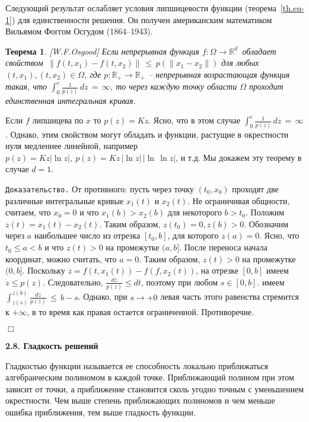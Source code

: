 \documentclass[12pt,a4paper]{article}
\newtheorem{theorem}{Теорема}
\newcommand{\re}{{\mathbb R}}
\begin{document}
Следующий результат ослабляет условия липшицевости функции (теорема~\ref{th.eu-1}) для единственности решения.
Он получен американским математиком Вильямом Фоггом Осгудом  (1864--1943).
\begin{theorem}\label{th.osgud}[W.F.Osgood]
Если непрерывная функция $f: \Omega \to \re^d\, $ обладает свойством
 $\, \|f(t, x_1) - f(t, x_2)\| \, \le \, p(\|x_1 - x_2\|)$
для любых $(t, x_1), (t, x_2) \in \Omega$, где $p: \re_+ \to \re_+$ --  непрерывная возрастающая функция
такая, что $\int_{0}^{c} \frac{1}{p(z)}\, d z \, = \, \infty$, то через каждую точку области $\Omega$ проходит единственная интегральная кривая.
\end{theorem}
Если $f$ липшицева по $x$ то $p(z) = Kz$. Ясно, что в этом случае $\int_{0}^{c} \frac{1}{p(z)}\, d z \, = \, \infty$.
Однако, этим свойством могут обладать и функции, растущие в окрестности нуля медленнее  линейной, например $p(z) = K z |\ln z|, \ p(z) = K z \, |\ln z|\, |\ln \, \ln z|$, и т.д. Мы докажем эту теорему в случае $d=1$.
\smallskip

{\tt Доказательство.} От противного: пусть  через точку $(t_0, x_0)$ проходят две различные интегральные кривые
$x_1(t)$ и $x_2(t)$. Не ограничивая общности, считаем, что $x_0 = 0$ и что $
x_1(b) > x_2 (b)$ для некоторого $b > t_0$. Положим $z (t) = x_1(t) - x_2(t)$. Таким образом,
 $z(t_0) = 0, z(b)  > 0$.
 Обозначим через $a$ наибольшее число из отрезка $[t_0, b]$, для которого $z(a) = 0$.
 Ясно, что $t_0\le a < b$ и что $z(t) > 0$ на промежутке $(a, b]$.
 После переноса начала координат, можно считать, что $a=0$. Таким образом, $z(t)>0$
 на промежутке $(0, b]$. Поскольку  $\dot z = f(t, x_1(t)) - f(f, x_2(t))$, на отрезке $[0, b]$
 имеем $\dot z \le p(z)$. Следовательно, $\frac{dz}{p(z)} \le dt$, поэтому при любом $s \in [0, b]$.
имеем  $\int_{z(s)}^{z(b)} \frac{d z}{p(z)}\, \le \, b - s $.
  Однако, при $s \to +0$ левая часть этого равенства стремится к $+\infty$, в то время как
  правая остается ограниченной. Противоречие.

   {\hfill $\Box$}
\medskip


\medskip
\begin{center}
\textbf{2.8. Гладкость решений}
\end{center}
\medskip

Гладкостью функции называется ее способность локально приближаться алгебраическим полиномом в каждой точке.
Приближающий полином при этом зависит от точки, а приближение становится сколь угодно точным с уменьшением окрестности.
 Чем выше степень приближающих полиномов и чем меньше ошибка приближения, тем выше гладкость функции.
\end{document}
